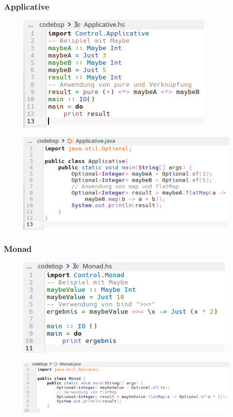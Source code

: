 \documentclass{beamer}
\begin{document}
\begin{frame}
\frametitle{Applicative}
 \begin{figure}
     \centering
     \includegraphics[scale=0.5]{bilder/FP-Applicative-hs.png}
 \end{figure}
 \begin{figure}
     \centering
     \includegraphics[scale=0.5]{bilder/FP-Applicative-java.png}
 \end{figure}
\end{frame}

\begin{frame}
\frametitle{Monad}

  \begin{figure}
     \centering
     \includegraphics[scale=0.5]{bilder/FP-Monad-hs.png}
 \end{figure}
 \begin{figure}
     \centering
     \includegraphics[scale=0.5]{bilder/FP-Monad-java.png}
 \end{figure}

\end{frame}
\end{document}
